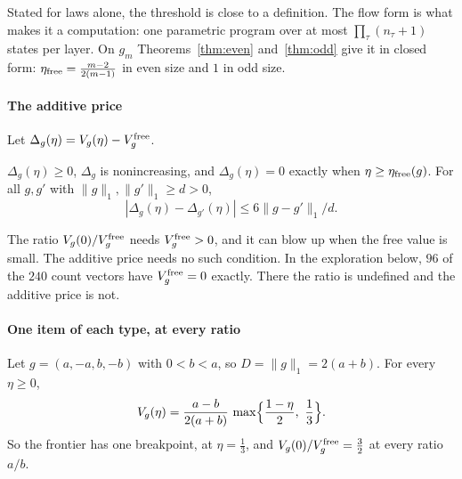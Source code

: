 Stated for laws alone, the threshold is close to a definition. The flow form is what makes it a
computation: one parametric program over at most $\prod_\tau(n_\tau+1)$ states per layer. On
$g_m$ Theorems~\ref{thm:even} and~\ref{thm:odd} give it in closed form:
$\eta_{\rm free}=\frac{m-2}{2(m-1)}$ in even size and $1$ in odd size.

\paragraph{The additive price} Let $\Delta_g(\eta)=V_g(\eta)-V^{\rm free}_g$.

\begin{proposition}
\label{prop:gap}
$\Delta_g(\eta)\ge0$, $\Delta_g$ is nonincreasing, and $\Delta_g(\eta)=0$ exactly when
$\eta\ge\eta_{\rm free}(g)$. For all $g,g'$ with $\|g\|_1,\|g'\|_1\ge d>0$,
\[
|\Delta_g(\eta)-\Delta_{g'}(\eta)|\le6\|g-g'\|_1/d.
\]
\end{proposition}

The ratio $V_g(0)/V^{\rm free}_g$ needs $V^{\rm free}_g>0$, and it can blow up when the free
value is small. The additive price needs no such condition. In the exploration below, $96$ of the
$240$ count vectors have $V^{\rm free}_g=0$ exactly. There the ratio is undefined and the
additive price is not.

\paragraph{One item of each type, at every ratio}
\begin{theorem}
\label{thm:twomag}
Let $g=(a,-a,b,-b)$ with $0<b<a$, so $D=\|g\|_1=2(a+b)$. For every $\eta\ge0$,
\[
V_g(\eta)=\frac{a-b}{2(a+b)}\,\max\Bigl\{\frac{1-\eta}2,\ \frac13\Bigr\}.
\]
So the frontier has one breakpoint, at $\eta=\frac13$, and $V_g(0)/V_g^{\rm free}=\frac32$ at
every ratio $a/b$.
\end{theorem}

